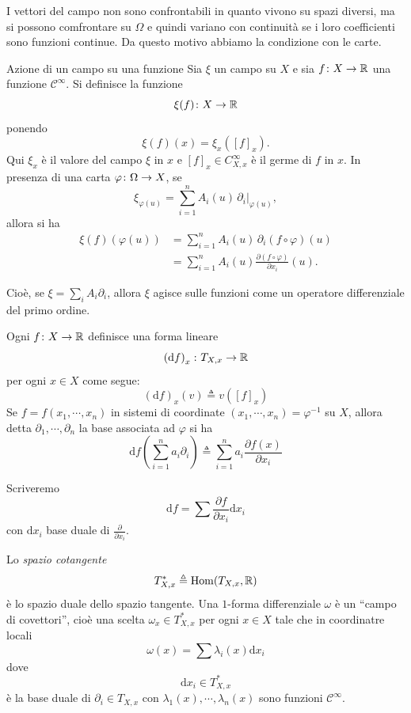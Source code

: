 \documentclass[a4paper]{article}
\begin{document}
I vettori del campo non sono confrontabili in quanto vivono su spazi diversi,
ma si possono comfrontare su \(\Omega\) e quindi variano con continuità se i loro coefficienti
sono funzioni continue. Da questo motivo abbiamo la condizione con le carte.

\begin{snippetdefinition}{Azione di un campo su una funzione}
    Sia \(\xi\) un campo su \(X\) e sia \(f \colon X \to \mathbb{R}\)
    una funzione \(\mathcal C^\infty\). Si definisce la funzione
    \[
        \xi(f) \colon X \to \mathbb{R}
    \]
    ponendo
    \[
        \xi(f)(x) = \xi_x([f]_x).
    \]
    Qui \(\xi_x\) è il valore del campo \(\xi\) in \(x\) e
    \([f]_x \in C^\infty_{X,x}\) è il germe di \(f\) in \(x\).
    In presenza di una carta \(\varphi \colon \Omega \to X\), se
    \[
        \xi_{\varphi(u)} = \sum_{i=1}^n A_i(u)\,\partial_i\big|_{\varphi(u)},
    \]
    allora si ha
    \begin{align*}
        \xi(f)(\varphi(u))
        &= \sum_{i=1}^n A_i(u)\,\partial_i(f \circ \varphi)(u) \\
        &= \sum_{i=1}^n A_i(u)
        \frac{\partial (f \circ \varphi)}{\partial x_i}(u).
    \end{align*}
\end{snippetdefinition}

Cioè, se \(\xi = \sum_i A_i \partial_i\), allora \(\xi\) agisce sulle
funzioni come un operatore differenziale del primo ordine.

\begin{snippetdefinition}{}
    Ogni \(f \colon X \to \mathbb{R}\)
    definisce una forma lineare
    \[
        \left(\text{d}f\right)_x \colon T_{X,x} \to \mathbb{R}
    \]
    per ogni \(x \in X\) come segue:
    \[
        \left(\text{d}f\right)_x(v) \triangleq v([f]_x)
    \]
    Se \(f = f(x_1, \cdots, x_n)\)
    in sistemi di coordinate \((x_1, \cdots, x_n) = \varphi^{-1}\)
    su \(X\), allora detta \(\partial_1, \cdots, \partial_n\)
    la base associata ad \(\varphi\) si ha
    \[
        \text{d}f\left(\sum_{i=1}^n a_i\partial_i\right)
        \triangleq \sum_{i=1}^n a_i \frac{\partial f(x)}{\partial x_i}
    \]
\end{snippetdefinition}

Scriveremo \[
    \text{d}f = \sum \frac{\partial f}{\partial x_i} \text{d}x_i
\]
con \(\text{d}x_i\) base duale di \(\frac{\partial}{\partial x_i}\).

\begin{snippetdefinition}{}
    Lo \emph{spazio cotangente}
    \[
        T_{X,x}^* \triangleq \operatorname{Hom}(T_{X,x}, \mathbb{R})
    \]
    è lo spazio duale dello spazio tangente.
    Una \(1\)-forma differenziale \(\omega\) è un
    ``campo di covettori'',
    cioè una scelta \(\omega_x \in T_{X,x}^*\)
    per ogni \(x \in X\) tale che in coordinatre locali
    \[
        \omega(x) = \sum \lambda_i(x) \text{d}x_i
    \]
    dove \[
        \text{d}x_i \in T_{X,x}^*
    \]
    è la base duale di \(\partial_i \in T_{X,x}\)
    con \(\lambda_1(x), \cdots, \lambda_n(x)\)
    sono funzioni \(\mathcal C^\infty\).
\end{snippetdefinition}
\end{document}
